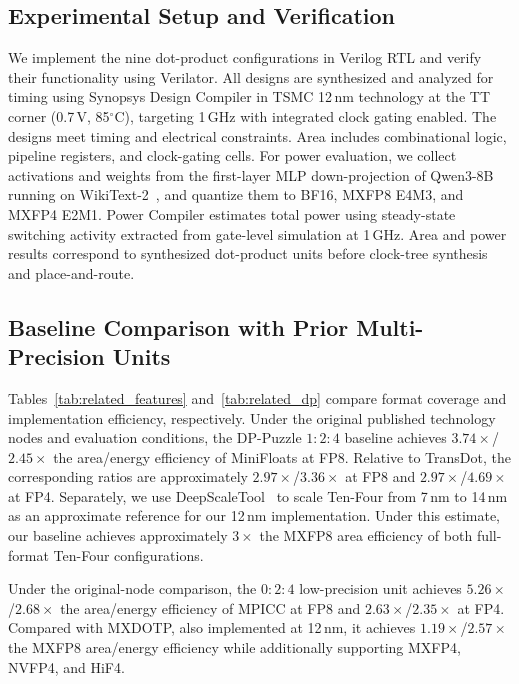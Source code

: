 \documentclass[conference,10pt,letterpaper]{IEEEtran}
\begin{document}
\subsection{Experimental Setup and Verification}
\label{sec:eval_setup}
\label{sec:numerical_validation}

We implement the nine dot-product configurations in Verilog RTL and verify their functionality using Verilator. All designs are synthesized and analyzed for timing using Synopsys Design Compiler in TSMC 12\,nm technology at the TT corner (0.7\,V, 85$^\circ$C), targeting 1\,GHz with integrated clock gating enabled. The designs meet timing and electrical constraints. Area includes combinational logic, pipeline registers, and clock-gating cells. For power evaluation, we collect activations and weights from the first-layer MLP down-projection of Qwen3-8B running on WikiText-2~\cite{qwen3technicalreport,merity2016pointer}, and quantize them to BF16, MXFP8 E4M3, and MXFP4 E2M1. Power Compiler estimates total power using steady-state switching activity extracted from gate-level simulation at 1\,GHz. Area and power results correspond to synthesized dot-product units before clock-tree synthesis and place-and-route.

\subsection{Baseline Comparison with Prior Multi-Precision Units}
\label{sec:related_dp_evaluation}


Tables~\ref{tab:related_features} and~\ref{tab:related_dp} compare format coverage and implementation efficiency, respectively. Under the original published technology nodes and evaluation conditions, the DP-Puzzle $1:2:4$ baseline achieves $3.74\times$/$2.45\times$ the area/energy efficiency of MiniFloats at FP8. Relative to TransDot, the corresponding ratios are approximately $2.97\times$/$3.36\times$ at FP8 and $2.97\times$/$4.69\times$ at FP4. Separately, we use DeepScaleTool~\cite{sarangi2021deepscaletool} to scale Ten-Four from 7\,nm to 14\,nm as an approximate reference for our 12\,nm implementation. Under this estimate, our baseline achieves approximately $3\times$ the MXFP8 area efficiency of both full-format Ten-Four configurations.

Under the original-node comparison, the $0:2:4$ low-precision unit achieves $5.26\times$/$2.68\times$ the area/energy efficiency of MPICC at FP8 and $2.63\times$/$2.35\times$ at FP4. Compared with MXDOTP, also implemented at 12\,nm, it achieves $1.19\times$/$2.57\times$ the MXFP8 area/energy efficiency while additionally supporting MXFP4, NVFP4, and HiF4.
\end{document}
